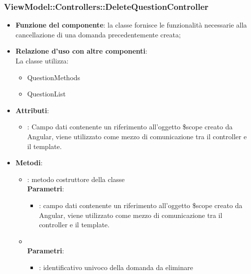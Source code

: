 \subsubsection{ViewModel::Controllers::DeleteQuestionController}
\begin{itemize}
\item\textbf{Funzione del componente}: la classe fornisce le funzionalità necessarie alla cancellazione di una domanda precedentemente creata;
	\item\textbf{Relazione d'uso con altre componenti}: \\
La classe utilizza:
	\begin{itemize}
		\item QuestionMethods
		\item QuestionList
	\end{itemize}
\item\textbf{Attributi}:
	\begin{itemize}
		\item{}: Campo dati contenente un riferimento all’oggetto \$scope creato da Angular, viene utilizzato come mezzo di comunicazione tra il controller e il template.\\

	\end{itemize}
\item\textbf{Metodi}:
	\begin{itemize}
		\item{}: metodo costruttore della classe\\
		\textbf{Parametri}:
			\begin{itemize}
				\item{}: campo dati contenente un riferimento all’oggetto \$scope creato da Angular, viene utilizzato come mezzo di comunicazione tra il controller e il template.\\
			\end{itemize}
		\item{}\\
		\textbf{Parametri}:
			\begin{itemize}
				\item{}: identificativo univoco della domanda da eliminare\\
			\end{itemize}
	\end{itemize}
\end{itemize}

